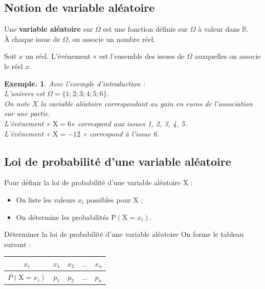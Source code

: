 \documentclass[12pt]{article}
\theoremstyle{break}
\newtheorem*{example}{Exemple.}
\begin{document}
\subsection{Notion de variable aléatoire}
\begin{definition}{}{}
  Une \textbf{variable aléatoire} sur $\Omega$ est une fonction définie sur $\Omega$ à valeur dans $\mathbb{R}$.\\
  À chaque issue de $\Omega$, on associe un nombre réel.
\end{definition}

\begin{definition}{}{}
  Soit $x$ un réel. L'événement «  est l'ensemble des issues de $\Omega$ auxquelles on associe le réel $x$.
\end{definition}

\begin{example}
  Avec l'exemple d'introduction :\\
  L'univers est $\Omega=\{1 ; 2 ; 3 ; 4 ; 5 ; 6\}$.\\
  On note $X$ la variable aléatoire correspondant au gain en euros de l'association sur une partie.\\
  L'événement « $\mathrm{X}=6 »$ correspond aux issues 1, 2, 3, 4, 5.\\
  L'événement « $\mathrm{X}=-12$ » correspond à l'issue 6.
\end{example}

\subsection{Loi de probabilité d'une variable aléatoire}
\begin{definition}{}{}
  Pour définir la loi de probabilité d'une variable aléatoire X :

  \begin{itemize}
    \item On liste les valeurs $x_{i}$ possibles pour X ;
    \item On détermine les probabilités $\mathrm{P}\left(\mathrm{X}=x_{i}\right)$.
  \end{itemize}
\end{definition}

\begin{method}{Déterminer la loi de probabilité d'une variable aléatoire}{}
On forme le tableau suivant :

\begin{center}
  \begin{tabular}{|c|c|c|c|c|}
    \hline
    $x_{i}$ & $x_{1}$ & $x_{2}$ & $\ldots$ & $x_{n}$ \\
    \hline
    $P\left(\mathrm{X}=x_{i}\right)$ & $p_{1}$ & $p_{2}$ & $\ldots$ & $p_{n}$ \\
    \hline
  \end{tabular}
\end{center}
\end{method}
\end{document}
